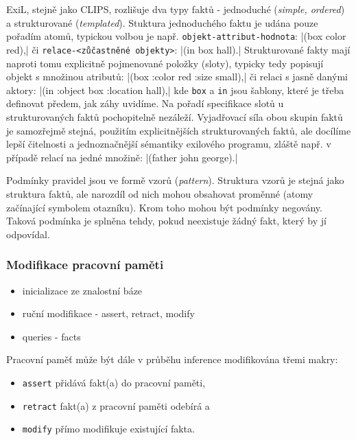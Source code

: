 ExiL, stejně jako CLIPS, rozlišuje dva typy faktů - jednoduché (\emph{simple,
ordered}) a strukturované (\emph{templated}). Stuktura jednoduchého faktu je udána
pouze pořadím atomů, typickou volbou je např. \verb|objekt-attribut-hodnota|:
\cl|(box color red),| či \verb|relace-<zůčastněné objekty>|: \cl|(in box hall).|
Strukturované fakty mají naproti tomu explicitně pojmenované položky (sloty),
typicky tedy popisují objekt s množinou atributů: \cl|(box :color red :size small),|
či relaci s jasně danými aktory: \cl|(in :object box :location hall),| kde
\verb|box| a \verb|in| jsou šablony, které je třeba definovat předem, jak záhy
uvidíme. Na pořadí specifikace slotů u strukturovaných faktů pochopitelně
nezáleží. Vyjadřovací síla obou skupin faktů je samozřejmě stejná, použitím
explicitnějších strukturovaných faktů, ale docílíme lepší čitelnosti a
jednoznačnější sémantiky exilového programu, zláště např. v případě relací na
jedné množině: \cl|(father john george).|

Podmínky pravidel jsou ve formě vzorů (\emph{pattern}). Struktura vzorů je
stejná jako struktura faktů, ale narozdíl od nich mohou obsahovat proměnné
(atomy začínající symbolem otazníku).  Krom toho mohou být podmínky negovány.
Taková podmínka je splněna tehdy, pokud neexistuje žádný fakt, který by jí
odpovídal.

\subsubsection{Modifikace pracovní paměti}
\label{modifikace}
\begin{framed}
  \begin{itemize}
    \item inicializace ze znalostní báze
    \item ruční modifikace - assert, retract, modify
    \item queries - facts
  \end{itemize}
\end{framed}

Pracovní paměť může být dále v průběhu inference modifikována třemi makry:
\begin{itemize}
  \item \verb|assert| přidává fakt(a) do pracovní paměti,
  \item \verb|retract| fakt(a) z pracovní paměti odebírá a
  \item \verb|modify| přímo modifikuje existující fakta.
\end{itemize}


